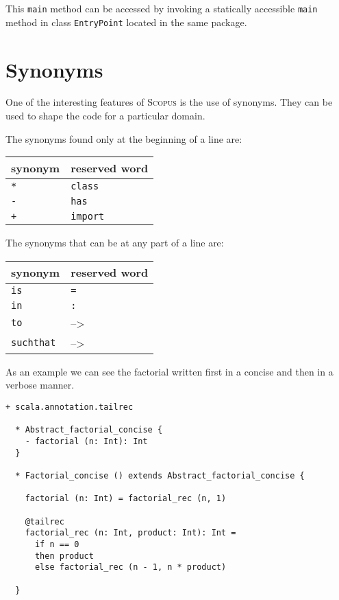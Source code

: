 \documentclass[12pt,a4paper]{book}
\newcommand{\srccode}[1]{\texttt{{#1}}}
\newcommand{\reservedWord}[1]{{\color{blue}\srccode{#1}}\xspace}
\newcommand{\sdef}{\srccode{=}}
\newcommand{\scolon}{\srccode{:}}
\newcommand{\sclass}{\reservedWord{class}}
\newcommand{\shas}{\reservedWord{has}}
\newcommand{\simport}{\reservedWord{import}}
\newcommand{\sasterisk}{\srccode{*}}
\newcommand{\splus}{\srccode{+}}
\newcommand{\sminus}{\srccode{-}}
\newcommand{\sis}{\reservedWord{is}}
\newcommand{\scin}{\reservedWord{in}}
\newcommand{\sto}{\reservedWord{to}}
\newcommand{\ssuchthat}{\reservedWord{suchthat}}
\newcommand{\Scopus}{\textsc{Scopus}\xspace}
\newcommand{\lambdaSymbol}{{\tiny--\textgreater}\xspace}
\begin{document}
    This \srccode{main} method can be accessed by invoking a statically accessible \srccode{main} method in class \srccode{EntryPoint} located in the same package.


    \section{Synonyms}

    One of the interesting features of \Scopus is the use of synonyms.
    They can be used to shape the code for a particular domain.

    The synonyms found only at the beginning of a line are:

    \begin{center}
        \begin{tabular}{|ll|}
            \hline
            \textbf{synonym} & \textbf{reserved word} \\
            \hline
            \sasterisk       & \sclass                \\
            \hline
            \sminus          & \shas                  \\
            \hline
            \splus           & \simport               \\
            \hline
        \end{tabular}
    \end{center}

    The synonyms that can be at any part of a line are:

    \begin{center}
        \begin{tabular}{|ll|}
            \hline
            \textbf{synonym} & \textbf{reserved word} \\
            \hline
            \sis             & \sdef                  \\
            \hline
            \scin            & \scolon                \\
            \hline
            \sto             & \lambdaSymbol          \\
            \ssuchthat       & \lambdaSymbol          \\
            \hline
        \end{tabular}
    \end{center}

    As an example we can see the factorial written first in a concise and then in a verbose manner.

    \begin{lstlisting}[label={lst:exampleFactorialConcise}]
  + scala.annotation.tailrec

  * Abstract_factorial_concise {
    - factorial (n: Int): Int
  }

  * Factorial_concise () extends Abstract_factorial_concise {

    factorial (n: Int) = factorial_rec (n, 1)

    @tailrec
    factorial_rec (n: Int, product: Int): Int =
      if n == 0
      then product
      else factorial_rec (n - 1, n * product)

  }
    \end{lstlisting}
\end{document}
